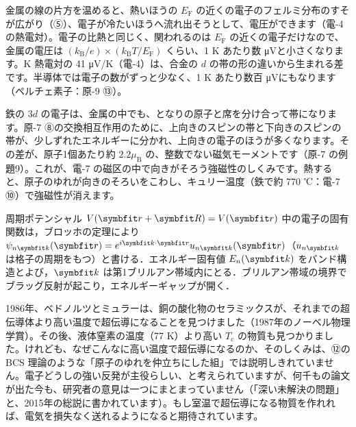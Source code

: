 金属の線の片方を温めると、熱いほうの $E_{\mathrm F}$ の近くの電子のフェルミ分布のすそが広がり（⑤）、電子が冷たいほうへ流れ出そうとして、電圧ができます（電-4 の熱電対）。電子の比熱と同じく、関われるのは $E_{\mathrm F}$ の近くの電子だけなので、金属の電圧は $(k_{\mathrm B}/e)\times(k_{\mathrm B}T/E_{\mathrm F})$ くらい、1 K あたり数 \si{\micro V}と小さくなります。K 熱電対の 41 \si{\micro V}/K（電-4）は、合金の $d$ の帯の形の違いから生まれる差です。半導体では電子の数がずっと少なく、1 K あたり数百 \si{\micro V}にもなります（ペルチェ素子：原-9 ⑬）。

鉄の $3d$ の電子は、金属の中でも、となりの原子と席を分け合って帯になります。原-7 ⑧の交換相互作用のために、上向きのスピンの帯と下向きのスピンの帯が、少しずれたエネルギーに分かれ、上向きの電子のほうが多くなります。その差が、原子1個あたり約 $2.2\mu_{\mathrm B}$ の、整数でない磁気モーメントです（原-7 の例題9）。これが、電-7 の磁区の中で向きがそろう強磁性のしくみです。熱すると、原子のゆれが向きのそろいをこわし、キュリー温度（鉄で約 770 ℃：電-7 ⑩）で強磁性が消えます。

\begin{senmonsho}[固体物理の専門書の書き方]
\begin{bkhonbun}
周期ポテンシャル $V(\symbfit r+\symbfit R)=V(\symbfit r)$ 中の電子の固有関数は，ブロッホの定理により $\psi_{n\symbfit k}(\symbfit r)=e^{i\symbfit k\cdot\symbfit r}u_{n\symbfit k}(\symbfit r)$（$u_{n\symbfit k}$ は格子の周期をもつ）と書ける．エネルギー固有値 $E_n(\symbfit k)$ をバンド構造とよび，$\symbfit k$ は第1ブリルアン帯域内にとる．ブリルアン帯域の境界でブラッグ反射が起こり，エネルギーギャップが開く．
\end{bkhonbun}
\end{senmonsho}

\begin{phmada}[高温超伝導のしくみは？]
1986年、ベドノルツとミュラーは、銅の酸化物のセラミックスが、それまでの超伝導体より高い温度で超伝導になることを見つけました（1987年のノーベル物理学賞）。その後、液体窒素の温度（77 K）より高い $T_{\mathrm c}$ の物質も見つかりました。けれども、なぜこんなに高い温度で超伝導になるのか、そのしくみは、⑫の BCS 理論のような「原子のゆれを仲立ちにした組」では説明しきれていません。電子どうしの強い反発が主役らしい、と考えられていますが、何千もの論文が出た今も、研究者の意見は一つにまとまっていません（「深い未解決の問題」と、2015年の総説に書かれています）。もし室温で超伝導になる物質を作れれば、電気を損失なく送れるようになると期待されています。
\end{phmada}

